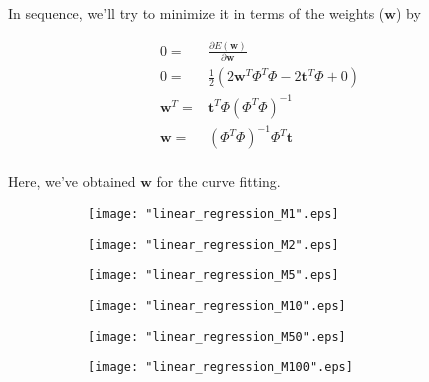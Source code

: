 \begin{frame}{\insertsubsection}
In sequence, we'll try to minimize it in terms of the weights ($\mathbf{w}$) by

\begin{align*}
	0 =& \frac{\partial E(\mathbf{w})}{\partial \mathbf{w}} \\
	0 =& \frac{1}{2} \left( 2 \mathbf{w}^T \Phi^T \Phi  -  2\mathbf{t}^T \Phi + 0 \right) \\
	\mathbf{w}^T =&  \mathbf{t}^T \Phi \left( \Phi^T \Phi \right)^{-1} \\
	\mathbf{w} =& \left( \Phi^T \Phi \right)^{-1}\Phi^T \mathbf{t} \\
\end{align*}

Here, we've obtained $\mathbf{w}$ for the curve fitting.

\end{frame}

\begin{frame}{\insertsubsection}

\begin{figure}
\begin{subfigure}{.3\textwidth}
  \centering
  \texttt{[image: "linear\_regression\_M1".eps]}
\end{subfigure}%
\begin{subfigure}{.3\textwidth}
  \centering
  \texttt{[image: "linear\_regression\_M2".eps]}
\end{subfigure}
\begin{subfigure}{.3\textwidth}
  \centering
  \texttt{[image: "linear\_regression\_M5".eps]}
\end{subfigure}
\begin{subfigure}{.3\textwidth}
  \centering
  \texttt{[image: "linear\_regression\_M10".eps]}
\end{subfigure}%
\begin{subfigure}{.3\textwidth}
  \centering
  \texttt{[image: "linear\_regression\_M50".eps]}
\end{subfigure}
\begin{subfigure}{.3\textwidth}
  \centering
  \texttt{[image: "linear\_regression\_M100".eps]}
\end{subfigure}
\end{figure}

\end{frame}

